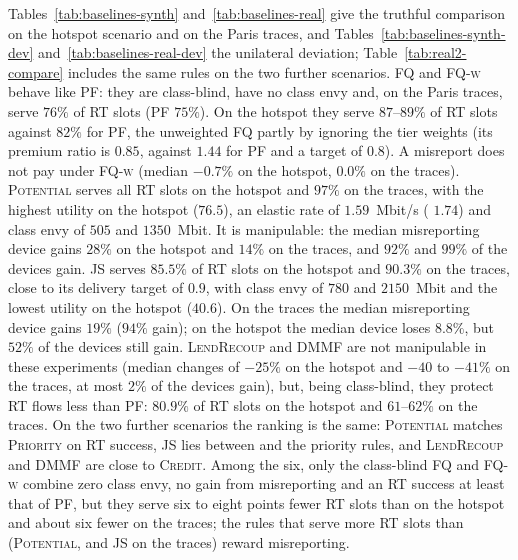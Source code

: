 Tables~\ref{tab:baselines-synth} and~\ref{tab:baselines-real} give the truthful comparison on the hotspot scenario and on the Paris traces, and Tables~\ref{tab:baselines-synth-dev} and~\ref{tab:baselines-real-dev} the unilateral deviation; Table~\ref{tab:real2-compare} includes the same rules on the two further scenarios.
\textsc{FQ} and \textsc{FQ-w} behave like \textsc{PF}: they are class-blind, have no class envy and, on the Paris traces, serve $76\%$ of RT slots (\textsc{PF} $75\%$). On the hotspot they serve $87$--$89\%$ of RT slots against $82\%$ for \textsc{PF}, the unweighted \textsc{FQ} partly by ignoring the tier weights (its premium ratio is $0.85$, against $1.44$ for \textsc{PF} and a target of $0.8$). A misreport does not pay under \textsc{FQ-w} (median $-0.7\%$ on the hotspot, $0.0\%$ on the traces).
\textsc{Potential} serves all RT slots on the hotspot and $97\%$ on the traces, with the highest utility on the hotspot ($76.5$), an elastic rate of $1.59$~Mbit/s (\repay{} $1.74$) and class envy of $505$ and $1350$~Mbit. It is manipulable: the median misreporting device gains $28\%$ on the hotspot and $14\%$ on the traces, and $92\%$ and $99\%$ of the devices gain.
\textsc{JS} serves $85.5\%$ of RT slots on the hotspot and $90.3\%$ on the traces, close to its delivery target of $0.9$, with class envy of $780$ and $2150$~Mbit and the lowest utility on the hotspot ($40.6$). On the traces the median misreporting device gains $19\%$ ($94\%$ gain); on the hotspot the median device loses $8.8\%$, but $52\%$ of the devices still gain.
\textsc{LendRecoup} and \textsc{DMMF} are not manipulable in these experiments (median changes of $-25\%$ on the hotspot and $-40$ to $-41\%$ on the traces, at most $2\%$ of the devices gain), but, being class-blind, they protect RT flows less than \textsc{PF}: $80.9\%$ of RT slots on the hotspot and $61$--$62\%$ on the traces.
On the two further scenarios the ranking is the same: \textsc{Potential} matches \textsc{Priority} on RT success, \textsc{JS} lies between \repay{} and the priority rules, and \textsc{LendRecoup} and \textsc{DMMF} are close to \textsc{Credit}.
Among the six, only the class-blind \textsc{FQ} and \textsc{FQ-w} combine zero class envy, no gain from misreporting and an RT success at least that of \textsc{PF}, but they serve six to eight points fewer RT slots than \repay{} on the hotspot and about six fewer on the traces; the rules that serve more RT slots than \repay{} (\textsc{Potential}, and \textsc{JS} on the traces) reward misreporting.

\begin{table}[t]
\centering
\caption{Additional baselines, hotspot scenario, truthful devices (mean over 10 seeds $\pm$ half-width of the 95\% interval). The first four rows are repeated from Table~\ref{tab:compare}.}
\label{tab:baselines-synth}
\resizebox{\linewidth}{!}{}
\end{table}

